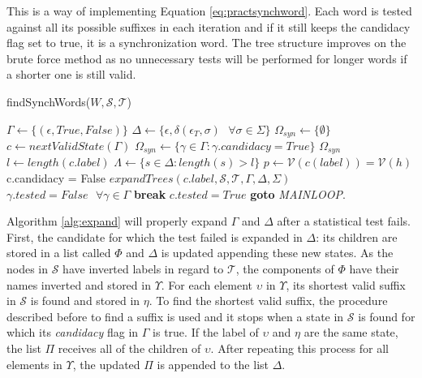 {This is a way of implementing Equation \ref{eq:practsynchword}. Each word is tested against all its possible suffixes in each iteration and if it still keeps the candidacy flag set to true, it is a synchronization word. The tree structure improves on the brute force method as no unnecessary tests will be performed for longer words if a shorter one is still valid.

\begin{algorithm} 
  \caption{findSynchWords($W, \mathcal{S}, \mathcal{T}$)\label{alg:findsynchwords}}
    \begin{algorithmic}[1]
      	\State $\Gamma \gets \{(\epsilon,True,False)\}$ 
        \State $\Delta \gets \{\epsilon, \delta(\epsilon_T, \sigma)\text{ } \forall \sigma \in \Sigma\}$
        \State $\Omega_{syn} \gets \{\emptyset\}$ 
      \EndProcedure	
        \State $\textit{c} \gets nextValidState(\Gamma)$
          \State $\Omega_{syn} \gets \{\gamma \in \Gamma:\gamma.candidacy=True\}$
          \State \Return $\Omega_{syn}$
        \Else
          \State $\textit{l} \gets length(c.label)$
            \State $\Lambda \gets \{\textit{s} \in \Delta : length(s) > l\}$
                \State $\textit{p} \gets \mathcal{V}(c(label)) = \mathcal{V}(h)$
                  \State c.candidacy = False
                  \State $expandTrees(c.label, \mathcal{S}, \mathcal{T}, \Gamma, \Delta, \Sigma)$
                  \State $\gamma.tested = False\text{ } \forall \gamma \in \Gamma$
                  \State \textbf{break}
                  \Else
                  	\State $c.tested = True$
                  \EndIf
                \EndIf
              \EndIf
            \EndFor
          \EndIf
          \State \textbf{goto} \emph{MAINLOOP}.
        \EndIf
      \EndProcedure
    \end{algorithmic}
  \end{algorithm}
  
Algorithm \ref{alg:expand} will properly expand $\Gamma$ and $\Delta$ after a statistical test fails. First, the candidate for which the test failed is expanded in $\Delta$: its children are stored in a list called $\Phi$ and $\Delta$ is updated appending these new states. As the nodes in $\mathcal{S}$ have inverted labels in regard to $\mathcal{T}$, the components of $\Phi$ have their names inverted and stored in $\Upsilon$. For each element $\upsilon$ in $\Upsilon$, its shortest valid suffix in $\mathcal{S}$ is found and stored in $\eta$. To find the shortest valid suffix, the procedure described before to find a suffix is used and it stops when a state in $\mathcal{S}$ is found for which its \textit{candidacy} flag in $\Gamma$ is true. If the label of $\upsilon$ and $\eta$ are the same state, the list $\Pi$ receives all of the children of $\upsilon$. After repeating this process for all elements in $\Upsilon$, the updated $\Pi$ is appended to the list $\Delta$.

}
